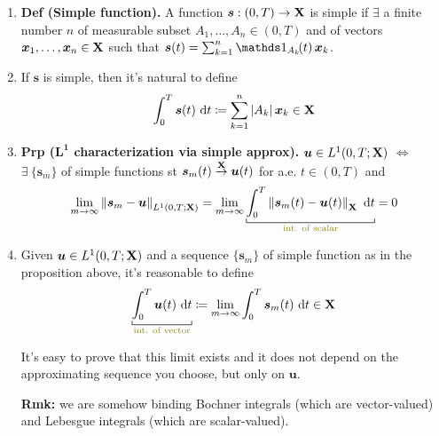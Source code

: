 \begin{enumerate}
    \item \textbf{Def (Simple function).} A function $\bm s:(0,T)\to\mathbf{X}$ is simple if $\exists$ a finite number $n$ of measurable subset $A_1,\dots,A_n\in (0,T)$ and of vectors $\bm x_1,\dots,\bm x_n\in \mathbf{X}$ such that $\bm s(t)=\sum_{k=1}^n \Ind_{A_k}\!(t)\,\bm x_k$.

    \item If $\bm s$ is simple, then it's natural to define
    \begin{equation*}
    \int_0^T \bm s(t)\  \mathrm{d} t\coloneq \sum_{k=1}^n \left| A_k \right| \bm x_k\in \mathbf{X}
    \end{equation*}

    \vspace{-0.7em}

    \item \textbf{Prp ($\bm L^{\bm 1}\!$ characterization via simple approx).} $\bm u\in L^1(0,T;\mathbf{X})$ $\Leftrightarrow$ $\exists\ \{\bm s_m\}$ of simple functions st $\bm s_m(t)\overset{\mathbf{X}}{\to}\bm u(t)$ for a.e. $t\in(0,T)$ and 
    \begin{equation*}
    \lim_{m\to\infty} \norm{\bm s_m-\bm u}_{L^1(0,T;\Xv)}=\lim_{m\to\infty} \underbracket[0.5pt]{\int_0^T \norm{\bm s_m(t)-\bm u(t)}_\Xv\dt}_{\text{\color{olive}{int. of scalar}}}= 0
    \end{equation*}

    \vspace{-0.5em}

    \item Given $\bm u\in L^1(0,T;\mathbf{X})$ and a sequence $\{\bm s_m\}$ of simple function as in the proposition above, it's reasonable to define
    \begin{equation*}
    \underbracket[0.5pt]{\int_0^T \bm u(t)\dt}_{\text{\color{olive}{int. of vector}}} \coloneq \lim_{m\to\infty} \int_0^T \bm s_m(t)\dt \in \Xv
    \end{equation*}

    \vspace{-0.5em}

    It's easy to prove that this limit exists and it does not depend on the approximating sequence you choose, but only on $\bm u$.

    \smallskip

    {\color{olive}\textbf{Rmk:} we are somehow binding Bochner integrals (which are vector-valued) and Lebesgue integrals (which are scalar-valued).}
\end{enumerate}

